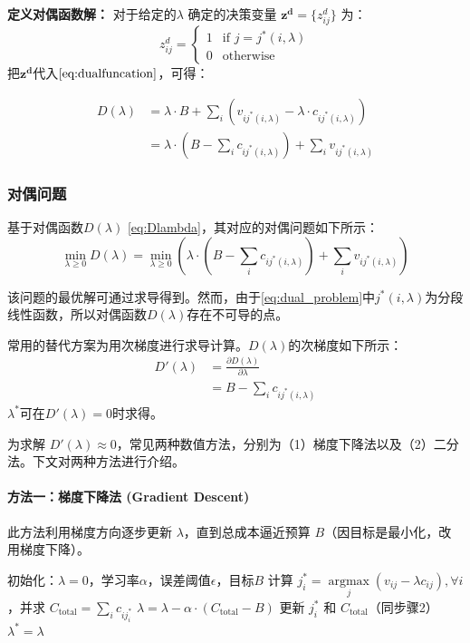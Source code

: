 \textbf{定义对偶函数解：}
对于给定的$\lambda$ 确定的决策变量  $\bm{z^d} = \{z_{ij}^d\}$ 为：
$$z_{ij}^d = 
\begin{cases} 
1 & \text{if } j = j^*(i,\lambda)\\ 
0 & \text{otherwise} 
\end{cases}$$
把$\bm {z^d}$代入$\eqref{eq:dualfuncation}$，可得：

\begin{equation}\label{eq:Dlambda}
\begin{aligned}
D(\lambda)&=\lambda \cdot B + \sum_i(v_{ij^*(i,\lambda)}-\lambda \cdot c_{ij^*(i,\lambda)})\\
&= \lambda \cdot \left( B-\sum_{i} c_{ij^*(i,\lambda)} \right) + \sum_{i} v_{ij^*(i,\lambda)}
\end{aligned}
\end{equation}

\subsubsection{对偶问题}
基于对偶函数$D(\lambda)$ \eqref{eq:Dlambda}，其对应的对偶问题如下所示：
\begin{equation}\label{eq:dual_problem}
\min_{\lambda \ge 0} D(\lambda)
=\min_{\lambda \ge0}\left(\lambda \cdot \left(B-\sum_ic_{ij^*(i,\lambda)}\right)+\sum_iv_{ij^*(i,\lambda)}\right)
\end{equation}

该问题的最优解可通过求导得到。然而，由于\eqref{eq:dual_problem}中$j^*(i,\lambda)$为分段线性函数，所以对偶函数$D(\lambda)$存在不可导的点。

常用的替代方案为用次梯度进行求导计算\citep{boyd2004convex}。$D(\lambda)$的次梯度如下所示：
\begin{align}
D'(\lambda) &= \frac{\partial D(\lambda)}{\partial \lambda} \\
&=  B-\sum_{i} c_{ij^*(i,\lambda)}
\end{align}
$\lambda^*$可在$D'(\lambda)=0$时求得。

为求解 $D'(\lambda) \approx 0$，常见两种数值方法，分别为（1）梯度下降法以及（2）二分法。下文对两种方法进行介绍。

\paragraph{方法一：梯度下降法 (Gradient Descent)}
此方法利用梯度方向逐步更新 $\lambda$，直到总成本逼近预算 $B$（因目标是最小化，改用梯度下降）。
\begin{algorithm}[H]
\caption{梯度下降求解 $\lambda^*$}
\begin{algorithmic}[1]
\State 初始化：$\lambda=0$，学习率$\alpha$，误差阈值$\epsilon$，目标$B$
\State 计算 $j^*_i = \underset{j}{\operatorname{argmax}} (v_{ij} - \lambda c_{ij}), \forall i$，并求 $C_{\text{total}} = \sum_i c_{ij^*_i}$
    \State $\lambda = \lambda - \alpha \cdot (C_{\text{total}} - B)$ 
    \State 更新 $j^*_i$ 和 $C_{\text{total}}$（同步骤2）
\EndWhile
\State \Return $\lambda^* = \lambda$
\end{algorithmic}
\end{algorithm}

